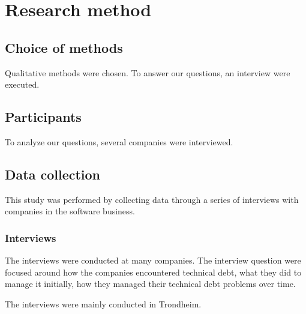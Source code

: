 \chapter{Research method}

\section{Choice of methods}
Qualitative methods were chosen. To answer our questions, an interview were executed.

\section{Participants}
To analyze our questions, several companies were interviewed. 

\section{Data collection}
This study was performed by collecting data through a series of interviews with companies in the software business.

\subsection{Interviews}
The interviews were conducted at many companies. The interview question were focused around how the companies encountered technical debt, what they did to manage it initially, how they managed their technical debt problems over time.

The interviews were mainly conducted in Trondheim. 









